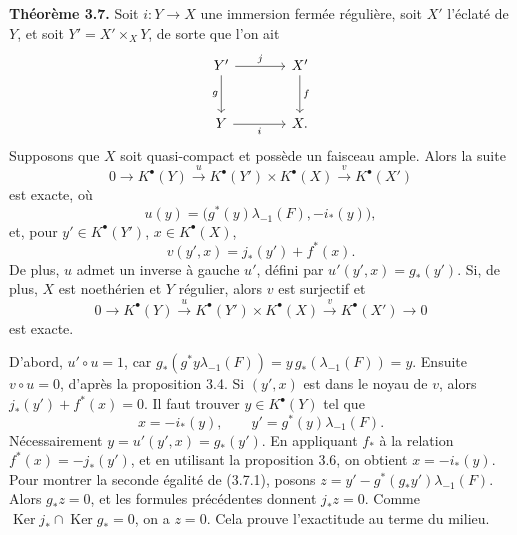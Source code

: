 \documentclass[11pt]{article}
\providecommand{\Ker}{\operatorname{Ker}}
\begin{document}
\textbf{Théorème 3.7.} Soit \(i:Y\to X\) une immersion fermée régulière, soit \(X'\) l'éclaté de \(Y\), et soit \(Y'=X'\times_XY\), de sorte que l'on ait
\[
\begin{tikzcd}[column sep=large,row sep=large]
Y' \arrow[r,"j"] \arrow[d,"g"'] & X' \arrow[d,"f"]\\
Y \arrow[r,"i"'] & X.
\end{tikzcd}
\]
Supposons que \(X\) soit quasi-compact et possède un faisceau ample. Alors la suite
\begin{equation}\tag{3.7.0}
0\to K^\bullet(Y)\xrightarrow{u}K^\bullet(Y')\times K^\bullet(X)\xrightarrow{v}K^\bullet(X')
\end{equation}
est exacte, où
\begin{equation}\tag{3.7.u}
u(y)=\bigl(g^*(y)\lambda_{-1}(F),-i_*(y)\bigr),
\end{equation}
et, pour \(y'\in K^\bullet(Y')\), \(x\in K^\bullet(X)\),
\begin{equation}\tag{3.7.v}
v(y',x)=j_*(y')+f^*(x).
\end{equation}
De plus, \(u\) admet un inverse à gauche \(u'\), défini par \(u'(y',x)=g_*(y')\). Si, de plus, \(X\) est noethérien et \(Y\) régulier, alors \(v\) est surjectif et
\begin{equation}\tag{3.7.2}
0\to K^\bullet(Y)\xrightarrow{u}K^\bullet(Y')\times K^\bullet(X)\xrightarrow{v}K^\bullet(X')\to0
\end{equation}
est exacte.

D'abord, \(u'\circ u=1\), car \(g_*(g^*y\lambda_{-1}(F))=y\,g_*(\lambda_{-1}(F))=y\). Ensuite \(v\circ u=0\), d'après la proposition 3.4. Si \((y',x)\) est dans le noyau de \(v\), alors \(j_*(y')+f^*(x)=0\). Il faut trouver \(y\in K^\bullet(Y)\) tel que
\begin{equation}\tag{3.7.1}
x=-i_*(y),\qquad y'=g^*(y)\lambda_{-1}(F).
\end{equation}
Nécessairement \(y=u'(y',x)=g_*(y')\). En appliquant \(f_*\) à la relation \(f^*(x)=-j_*(y')\), et en utilisant la proposition 3.6, on obtient \(x=-i_*(y)\). Pour montrer la seconde égalité de (3.7.1), posons \(z=y'-g^*(g_*y')\lambda_{-1}(F)\). Alors \(g_*z=0\), et les formules précédentes donnent \(j_*z=0\). Comme \(\Ker j_*\cap\Ker g_*=0\), on a \(z=0\). Cela prouve l'exactitude au terme du milieu.
\end{document}
